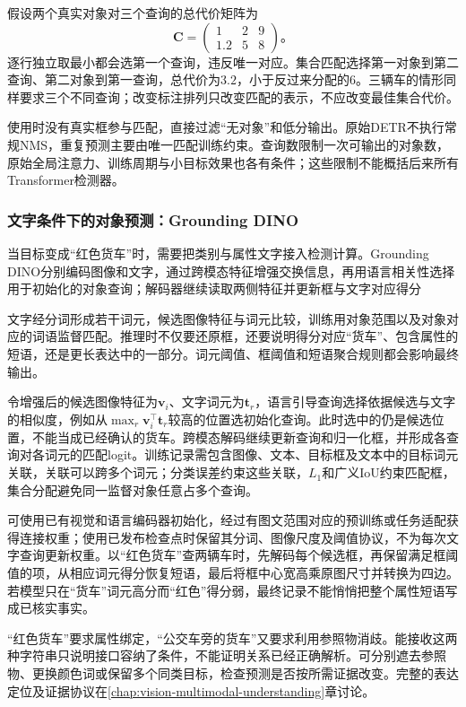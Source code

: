 假设两个真实对象对三个查询的总代价矩阵为
\[
 \bm{C}=\begin{pmatrix}1&2&9\\1.2&5&8\end{pmatrix}\text{。}
\]
逐行独立取最小都会选第一个查询，违反唯一对应。集合匹配选择第一对象到第二查询、第二对象到第一查询，总代价为$3.2$，小于反过来分配的$6$。三辆车的情形同样要求三个不同查询；改变标注排列只改变匹配的表示，不应改变最佳集合代价。

使用时没有真实框参与匹配，直接过滤“无对象”和低分输出。原始DETR不执行常规NMS，重复预测主要由唯一匹配训练约束。查询数限制一次可输出的对象数，原始全局注意力、训练周期与小目标效果也各有条件；这些限制不能概括后来所有Transformer检测器。

\Needspace{65mm}
\subsubsection{文字条件下的对象预测：Grounding DINO}
\label{sec:vision-recognition-grounding-dino}

当目标变成“红色货车”时，需要把类别与属性文字接入检测计算。Grounding DINO分别编码图像和文字，通过跨模态特征增强交换信息，再用语言相关性选择用于初始化的对象查询；解码器继续读取两侧特征并更新框与文字对应得分

文字经分词形成若干词元，候选图像特征与词元比较，训练用对象范围以及对象对应的词语监督匹配。推理时不仅要还原框，还要说明得分对应“货车”、包含属性的短语，还是更长表达中的一部分。词元阈值、框阈值和短语聚合规则都会影响最终输出。

令增强后的候选图像特征为$\bm{v}_i$、文字词元为$\bm{t}_r$，语言引导查询选择依据候选与文字的相似度，例如从$\max_r\bm{v}_i^\top\bm{t}_r$较高的位置选初始化查询。此时选中的仍是候选位置，不能当成已经确认的货车。跨模态解码继续更新查询和归一化框，并形成各查询对各词元的匹配logit。训练记录需包含图像、文本、目标框及文本中的目标词元关联，关联可以跨多个词元；分类误差约束这些关联，$L_1$和广义IoU约束匹配框，集合分配避免同一监督对象任意占多个查询。

可使用已有视觉和语言编码器初始化，经过有图文范围对应的预训练或任务适配获得连接权重；使用已发布检查点时保留其分词、图像尺度及阈值协议，不为每次文字查询更新权重。以“红色货车”查两辆车时，先解码每个候选框，再保留满足框阈值的项，从相应词元得分恢复短语，最后将框中心宽高乘原图尺寸并转换为四边。若模型只在“货车”词元高分而“红色”得分弱，最终记录不能悄悄把整个属性短语写成已核实事实。

“红色货车”要求属性绑定，“公交车旁的货车”又要求利用参照物消歧。能接收这两种字符串只说明接口容纳了条件，不能证明关系已经正确解析。可分别遮去参照物、更换颜色词或保留多个同类目标，检查预测是否按所需证据改变。完整的表达定位及证据协议在\ref{chap:vision-multimodal-understanding}章讨论。

